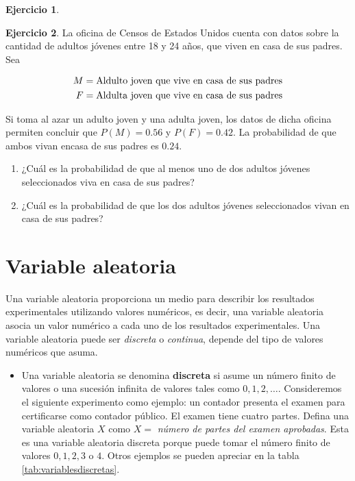 \documentclass[
  11pt,
]{book}
\providecommand{\tightlist}{%
  \setlength{\itemsep}{0pt}\setlength{\parskip}{0pt}}
\theoremstyle{definition}
\theoremstyle{definition}
\theoremstyle{definition}
\newtheorem{exercise}{Ejercicio}[chapter]
\theoremstyle{definition}
\theoremstyle{remark}
\begin{document}
\begin{enumerate}
\begin{exercise}
  \end{exercise}

  \begin{exercise}

  La oficina de Censos de Estados Unidos cuenta con datos sobre la cantidad de adultos jóvenes entre 18 y 24 años, que viven en casa de sus padres. Sea

  \begin{equation}
  \notag
  \begin{split}
  M &= \text{Aldulto joven que vive en casa de sus padres}\\
  F &= \text{Aldulta joven que vive en casa de sus padres}\\
  \end{split}
  \end{equation}

  Si toma al azar un adulto joven y una adulta joven, los datos de dicha oficina permiten concluir que \(P(M) = 0.56\) y \(P(F) = 0.42\). La probabilidad de que ambos vivan encasa de sus padres es \(0.24\).

  \begin{enumerate}
  \def\labelenumii{\alph{enumii}.}
  \tightlist
  \item
    ¿Cuál es la probabilidad de que al menos uno de dos adultos jóvenes seleccionados viva en casa de sus padres?
  \item
    ¿Cuál es la probabilidad de que los dos adultos jóvenes seleccionados vivan en casa de sus padres?
  \end{enumerate}

  \end{exercise}
\end{enumerate}

\section{Variable aleatoria}\label{variable-aleatoria}

Una variable aleatoria proporciona un medio para describir los resultados experimentales utilizando valores numéricos, es decir, una variable aleatoria asocia un valor numérico a cada uno de los resultados experimentales. Una variable aleatoria puede ser \emph{discreta} o \emph{continua}, depende del tipo de valores numéricos que asuma. \citep[página 187]{anderson}

\begin{itemize}
\tightlist
\item
  Una variable aleatoria se denomina \textbf{discreta} si asume un número finito de valores o una sucesión infinita de valores tales como \(0,1,2,\ldots\). Consideremos el siguiente experimento como ejemplo: un contador presenta el examen para certificarse como contador público. El examen tiene cuatro partes. Defina una variable aleatoria \(X\) como \(X =\) \emph{número de partes del examen aprobadas}. Esta es una variable aleatoria discreta porque puede tomar el número finito de valores \(0,1,2,3\) o \(4\). Otros ejemplos se pueden apreciar en la tabla \ref{tab:variablesdiscretas}.
\end{itemize}
\end{document}
